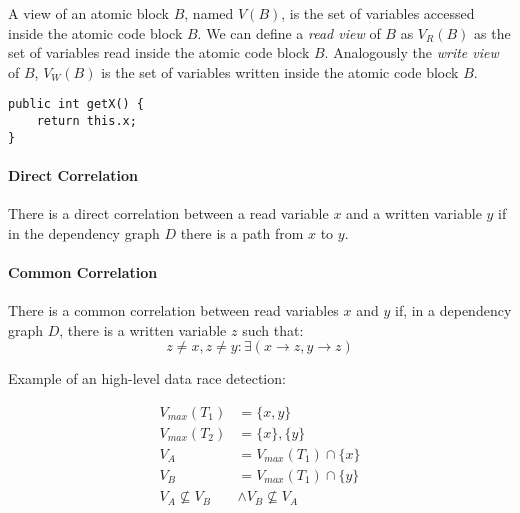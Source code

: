 A view of an atomic block $B$, named $V(B)$, is the set of variables accessed inside the atomic code block $B$.
We can define a \textit{read view} of $B$ as $V_{R}(B)$ as the set of variables read inside the atomic code block $B$.
Analogously the \textit{write view} of $B$, $V_{W}(B)$ is the set of variables written inside the atomic code block $B$.

\begin{lstlisting}[caption={
    The \texttt{getX} has the read view $V_{R}(\mathtt{getX}) = \{\mathtt{x}\}$ and the write view $V_{W}(\mathtt{getX}) = \{\}$.
}]
public int getX() {
    return this.x;
}
\end{lstlisting}

\paragraph{Direct Correlation}
There is a direct correlation between a read variable $x$ and a written variable $y$ if in the dependency graph $D$ there is a path from $x$ to $y$.

\paragraph{Common Correlation}
There is a common correlation between read variables $x$ and $y$ if,
in a dependency graph $D$, there is a written variable $z$ such that:
\begin{equation*}
    z \neq x, z \neq y : \exists \left(x \rightarrow z, y \rightarrow z\right)
\end{equation*}

Example of an high-level data race detection:

\begin{equation}
    \begin{split}
        V_{max}(T_1) & = \{x, y\} \\
        V_{max}(T_2) & = \{x\}, \{y\} \\
        V_A & = V_{max}(T_1) \cap \{x\} \\
        V_B & = V_{max}(T_1) \cap \{y\} \\
        V_A \nsubseteq V_B & \wedge V_B \nsubseteq V_A
    \end{split}
\end{equation}

